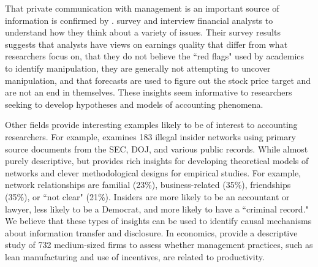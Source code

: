\documentclass[11pt,reqno,titlepage]{amsart}
\begin{document}
\begin{doublespace}
That private communication with management is an important source of information is confirmed by  \citet{Brown:2015kd}. \citet{Brown:2015kd} survey and interview financial analysts to understand how they think about a variety of issues.
Their survey results suggests that analysts have views on earnings quality that differ from what researchers focus on, that they do not believe the ``red flags" used by academics to identify manipulation, they are generally not attempting to uncover manipulation, and that forecasts are used to figure out the stock price target and are not an end in themselves.
These insights seem informative to researchers seeking to develop hypotheses and models of accounting phenomena.





Other fields provide interesting examples likely to be of interest to accounting researchers.
For example, \citet{Ahern:2014id} examines 183 illegal insider networks using primary source documents from the SEC, DOJ, and various public records. 
While almost purely descriptive, but provides rich insights for developing theoretical models of networks and clever methodological designs for empirical studies.
For example, network relationships are familial (23\%), business-related (35\%), friendships (35\%), or ``not clear" (21\%).
Insiders are more likely to be an accountant or lawyer, less likely to be a Democrat, and more likely to have a ``criminal record."
We believe that these types of insights can be used to identify causal mechanisms about information transfer and disclosure.
%
In economics, \citet{Bloom:2007ed} provide a descriptive study of 732 medium-sized firms to assess whether management practices, such as lean manufacturing and use of incentives, are related to productivity. 




\end{doublespace}
\end{document}

